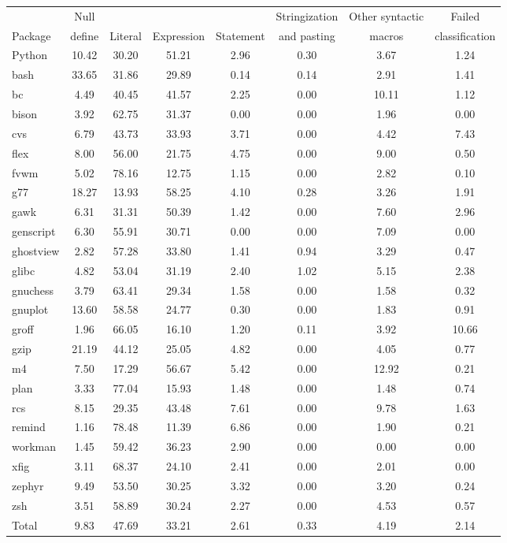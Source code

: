 \begin{tabular}{|l|c|c|c|c|c|c|c|}\hline
        & Null   &         &            &           & Stringization & Other syntactic & Failed \\
Package & define & Literal & Expression & Statement & and pasting   & macros          & classification\\\hline\hline
Python & 10.42 & 30.20 & 51.21 & 2.96 & 0.30 & 3.67 & 1.24\\\hline
bash & 33.65 & 31.86 & 29.89 & 0.14 & 0.14 & 2.91 & 1.41\\\hline
bc & 4.49 & 40.45 & 41.57 & 2.25 & 0.00 & 10.11 & 1.12\\\hline
bison & 3.92 & 62.75 & 31.37 & 0.00 & 0.00 & 1.96 & 0.00\\\hline
cvs & 6.79 & 43.73 & 33.93 & 3.71 & 0.00 & 4.42 & 7.43\\\hline
flex & 8.00 & 56.00 & 21.75 & 4.75 & 0.00 & 9.00 & 0.50\\\hline
fvwm & 5.02 & 78.16 & 12.75 & 1.15 & 0.00 & 2.82 & 0.10\\\hline
g77 & 18.27 & 13.93 & 58.25 & 4.10 & 0.28 & 3.26 & 1.91\\\hline
gawk & 6.31 & 31.31 & 50.39 & 1.42 & 0.00 & 7.60 & 2.96\\\hline
genscript & 6.30 & 55.91 & 30.71 & 0.00 & 0.00 & 7.09 & 0.00\\\hline
ghostview & 2.82 & 57.28 & 33.80 & 1.41 & 0.94 & 3.29 & 0.47\\\hline
glibc & 4.82 & 53.04 & 31.19 & 2.40 & 1.02 & 5.15 & 2.38\\\hline
gnuchess & 3.79 & 63.41 & 29.34 & 1.58 & 0.00 & 1.58 & 0.32\\\hline
gnuplot & 13.60 & 58.58 & 24.77 & 0.30 & 0.00 & 1.83 & 0.91\\\hline
groff & 1.96 & 66.05 & 16.10 & 1.20 & 0.11 & 3.92 & 10.66\\\hline
gzip & 21.19 & 44.12 & 25.05 & 4.82 & 0.00 & 4.05 & 0.77\\\hline
m4 & 7.50 & 17.29 & 56.67 & 5.42 & 0.00 & 12.92 & 0.21\\\hline
plan & 3.33 & 77.04 & 15.93 & 1.48 & 0.00 & 1.48 & 0.74\\\hline
rcs & 8.15 & 29.35 & 43.48 & 7.61 & 0.00 & 9.78 & 1.63\\\hline
remind & 1.16 & 78.48 & 11.39 & 6.86 & 0.00 & 1.90 & 0.21\\\hline
workman & 1.45 & 59.42 & 36.23 & 2.90 & 0.00 & 0.00 & 0.00\\\hline
xfig & 3.11 & 68.37 & 24.10 & 2.41 & 0.00 & 2.01 & 0.00\\\hline
zephyr & 9.49 & 53.50 & 30.25 & 3.32 & 0.00 & 3.20 & 0.24\\\hline
zsh & 3.51 & 58.89 & 30.24 & 2.27 & 0.00 & 4.53 & 0.57\\\hline
\hline
Total & 9.83 & 47.69 & 33.21 & 2.61 & 0.33 & 4.19 & 2.14\\\hline
\end{tabular}
